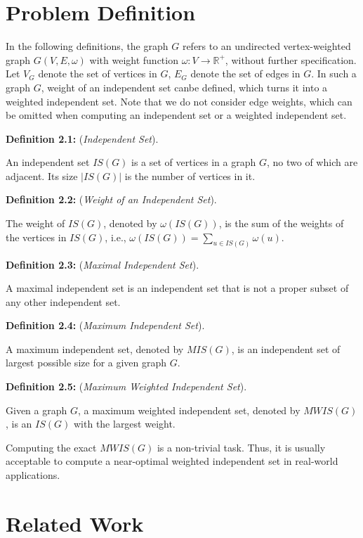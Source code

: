 \documentclass[sigconf, nonacm]{acmart}
\begin{document}
\section{Problem Definition}

In the following definitions, the graph $G$ refers to an undirected vertex-weighted graph $G(V,E,\omega)$ with weight function $\omega: V\to\mathbb{R}^+$, without further specification. Let $V_G$ denote the set of vertices in $G$, $E_G$ denote the set of edges in $G$. In such a graph $G$, weight of an independent set canbe defined, which turns it into a weighted independent set. Note that we do not consider edge weights, which can be omitted when computing an independent set or a weighted independent set.

\begin{framed}
\noindent\textbf{Definition 2.1:} (\emph{Independent Set}). 

An independent set $IS(G)$ is a set of vertices in a graph $G$, no two of which are adjacent. Its size $|IS(G)|$ is the number of vertices in it.

\noindent\textbf{Definition 2.2:} (\emph{Weight of an Independent Set}). 

The weight of $IS(G)$, denoted by $\omega(IS(G))$, is the sum of the weights of the vertices in $IS(G)$, i.e., $\omega(IS(G)) = \sum_{u\in IS(G)}\omega(u)$.

\noindent\textbf{Definition 2.3:} (\emph{Maximal Independent Set}). 

A maximal independent set is an independent set that is not a proper subset of any other independent set. 

\noindent\textbf{Definition 2.4:} (\emph{Maximum Independent Set}). 

A maximum independent set, denoted by $MIS(G)$, is an independent set of largest possible size for a given graph $G$.

\noindent\textbf{Definition 2.5:} (\emph{Maximum Weighted Independent Set}). 

Given a graph $G$, a maximum weighted independent set, denoted by $MWIS(G)$, is an $IS(G)$ with the largest weight.
\end{framed}

Computing the exact $MWIS(G)$ is a non-trivial task. Thus, it is usually acceptable to compute a near-optimal weighted independent set in real-world applications.

\section{Related Work}
\end{document}
